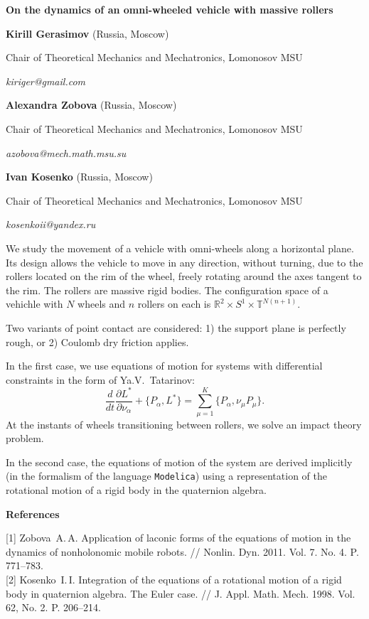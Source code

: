 \documentclass[12pt]{article}
\begin{document}
\centerline{\large\bf On the dynamics of an omni-wheeled vehicle with massive rollers}

\centerline{{\bf Kirill Gerasimov} (Russia, Moscow)}
\centerline{Chair of Theoretical Mechanics and Mechatronics, Lomonosov MSU}
\centerline{\it kiriger@gmail.com}

\centerline{{\bf Alexandra Zobova} (Russia, Moscow)}
\centerline{Chair of Theoretical Mechanics and Mechatronics, Lomonosov MSU}
\centerline{\it azobova@mech.math.msu.su}

\centerline{{\bf Ivan Kosenko} (Russia, Moscow)}
\centerline{Chair of Theoretical Mechanics and Mechatronics, Lomonosov MSU}
\centerline{\it kosenkoii@yandex.ru}

\medskip

We study the movement of a vehicle with omni-wheels along a horizontal plane. Its design allows the vehicle to move in any direction, without turning, due to the rollers located on the rim of the wheel, freely rotating around the axes tangent to the rim. The rollers are massive rigid bodies. The configuration space of a vehichle with $N$ wheels and $n$ rollers on each is $\mathbb{R}^2 \times S^1 \times \mathbb{T}^{N(n+1)}$.

Two variants of point contact are considered: 1) the support plane is perfectly rough, or 2) Coulomb dry friction applies.

In the first case, we use equations of motion for systems with differential constraints in the form of Ya.V.~Tatarinov:
$$
\frac{d}{dt}\frac{\partial L^{*}}{\partial \nu_\alpha} + \{P_\alpha, L^{*}\} = \sum\limits_{\mu = 1}^{K}\{P_\alpha, \nu_\mu P_\mu\}.
$$
At the instants of wheels transitioning between rollers, we solve an impact theory problem.

In the second case, the equations of motion of the system are derived implicitly (in the formalism of the language {\tt Modelica}) using a representation of the rotational motion of a rigid body in the quaternion algebra.

\begin{center}
{\bf References}
\end{center}
{[1]} Zobova~A.\,A. Application of laconic forms of the equations of motion in the dynamics of nonholonomic mobile robots. // Nonlin. Dyn. 2011. Vol. 7. No. 4. P. 771--783.\\
{[2]} Kosenko~I.\,I. Integration of the equations of a rotational motion of a rigid body in quaternion algebra. The Euler case. // J. Appl. Math. Mech. 1998. Vol. 62, No. 2. P. 206--214.\\
\end{document}

